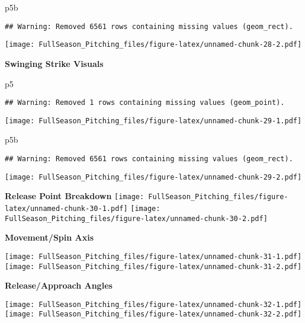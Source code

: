 \documentclass[]{article}
\newenvironment{Shaded}{\begin{snugshade}}{\end{snugshade}}
\newcommand{\NormalTok}[1]{#1}
\begin{document}
\begin{Shaded}
\begin{Highlighting}[]
\NormalTok{p5b}
\end{Highlighting}
\end{Shaded}

\begin{verbatim}
## Warning: Removed 6561 rows containing missing values (geom_rect).
\end{verbatim}

\texttt{[image: FullSeason\_Pitching\_files/figure-latex/unnamed-chunk-28-2.pdf]}

\textbf{Swinging Strike Visuals}

\begin{Shaded}
\begin{Highlighting}[]
\NormalTok{p5}
\end{Highlighting}
\end{Shaded}

\begin{verbatim}
## Warning: Removed 1 rows containing missing values (geom_point).
\end{verbatim}

\texttt{[image: FullSeason\_Pitching\_files/figure-latex/unnamed-chunk-29-1.pdf]}

\begin{Shaded}
\begin{Highlighting}[]
\NormalTok{p5b}
\end{Highlighting}
\end{Shaded}

\begin{verbatim}
## Warning: Removed 6561 rows containing missing values (geom_rect).
\end{verbatim}

\texttt{[image: FullSeason\_Pitching\_files/figure-latex/unnamed-chunk-29-2.pdf]}

\textbf{Release Point Breakdown}
\texttt{[image: FullSeason\_Pitching\_files/figure-latex/unnamed-chunk-30-1.pdf]}
\texttt{[image: FullSeason\_Pitching\_files/figure-latex/unnamed-chunk-30-2.pdf]}

\textbf{Movement/Spin Axis}

\texttt{[image: FullSeason\_Pitching\_files/figure-latex/unnamed-chunk-31-1.pdf]}
\texttt{[image: FullSeason\_Pitching\_files/figure-latex/unnamed-chunk-31-2.pdf]}

\textbf{Release/Approach Angles}

\texttt{[image: FullSeason\_Pitching\_files/figure-latex/unnamed-chunk-32-1.pdf]}
\texttt{[image: FullSeason\_Pitching\_files/figure-latex/unnamed-chunk-32-2.pdf]}
\end{document}
